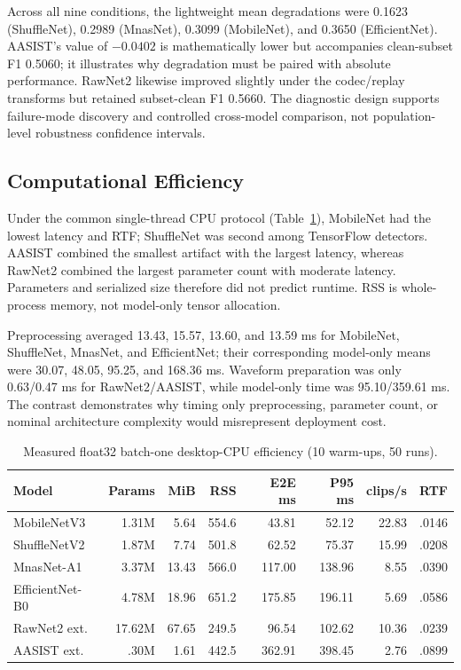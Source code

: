 \documentclass[10pt,journal,onecolumn,a4paper]{IEEEtran}
\begin{document}
Across all nine conditions, the lightweight mean degradations were 0.1623 (ShuffleNet), 0.2989 (MnasNet), 0.3099 (MobileNet), and 0.3650 (EfficientNet). AASIST's value of $-0.0402$ is mathematically lower but accompanies clean-subset F1 0.5060; it illustrates why degradation must be paired with absolute performance. RawNet2 likewise improved slightly under the codec/replay transforms but retained subset-clean F1 0.5660. The diagnostic design supports failure-mode discovery and controlled cross-model comparison, not population-level robustness confidence intervals.

\subsection{Computational Efficiency}
Under the common single-thread CPU protocol (Table~\ref{tab:efficiency}), MobileNet had the lowest latency and RTF; ShuffleNet was second among TensorFlow detectors. AASIST combined the smallest artifact with the largest latency, whereas RawNet2 combined the largest parameter count with moderate latency. Parameters and serialized size therefore did not predict runtime. RSS is whole-process memory, not model-only tensor allocation.

Preprocessing averaged 13.43, 15.57, 13.60, and 13.59 ms for MobileNet, ShuffleNet, MnasNet, and EfficientNet; their corresponding model-only means were 30.07, 48.05, 95.25, and 168.36 ms. Waveform preparation was only 0.63/0.47 ms for RawNet2/AASIST, while model-only time was 95.10/359.61 ms. The contrast demonstrates why timing only preprocessing, parameter count, or nominal architecture complexity would misrepresent deployment cost.

\begin{table}[!t]
\centering\scriptsize
\caption{Measured float32 batch-one desktop-CPU efficiency (10 warm-ups, 50 runs).}
\label{tab:efficiency}
\begin{tabularx}{\textwidth}{l r r r r r r r}
\toprule
Model & Params & MiB & RSS & E2E ms & P95 ms & clips/s & RTF \\
\midrule
MobileNetV3 & 1.31M & 5.64 & 554.6 & 43.81 & 52.12 & 22.83 & .0146 \\
ShuffleNetV2 & 1.87M & 7.74 & 501.8 & 62.52 & 75.37 & 15.99 & .0208 \\
MnasNet-A1 & 3.37M & 13.43 & 566.0 & 117.00 & 138.96 & 8.55 & .0390 \\
EfficientNet-B0 & 4.78M & 18.96 & 651.2 & 175.85 & 196.11 & 5.69 & .0586 \\
RawNet2 ext. & 17.62M & 67.65 & 249.5 & 96.54 & 102.62 & 10.36 & .0239 \\
AASIST ext. & .30M & 1.61 & 442.5 & 362.91 & 398.45 & 2.76 & .0899 \\
\bottomrule
\end{tabularx}
\end{table}
\end{document}
